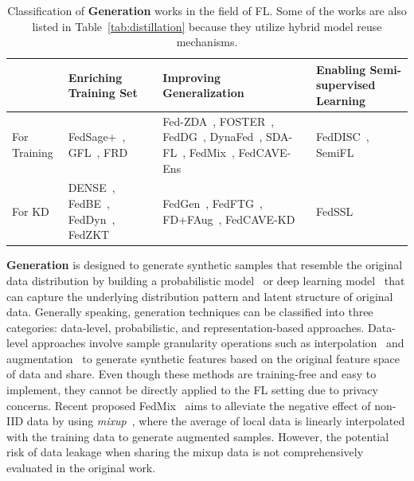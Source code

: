 \begin{table}[t]
  \centering
  \footnotesize
  \caption{Classification of \textbf{Generation} works in the field of FL. Some of the works are also listed in Table~\ref{tab:distillation} because they utilize hybrid model reuse mechanisms.}
  \label{tab:generation}

  \begin{tabular}{|l|p{3.1cm}|p{5cm}|p{4cm}|}
    \hline
    & Enriching Training Set & Improving Generalization  & Enabling Semi-supervised Learning  \\ \hline
    \multicolumn{1}{|l|}{For Training} & FedSage+~\cite{zhang2021subgraph}, GFL~\cite{cheng2023gfl}, \newline FRD~\cite{cha2019federated} & Fed-ZDA~\cite{hao2021towards}, FOSTER~\cite{yu2023turning}, FedDG~\cite{liu2021feddg}, DynaFed~\cite{pi2022dynafed}, SDA-FL~\cite{liz2022federated}, FedMix~\cite{yoon2021fedmix}, \newline FedCAVE-Ens~\cite{heinbaugh2023data} & FedDISC~\cite{yang2023exploring}, SemiFL~\cite{diao2022semifl}  \\ \hline
    \multicolumn{1}{|l|}{For KD} & DENSE~\cite{zhang2022dense}, FedBE~\cite{chen2020fedbe}, \newline FedDyn~\cite{jin2023feddyn}, FedZKT~\cite{zhang2022fedzkt} & FedGen~\cite{zhu2021data}, FedFTG~\cite{zhang2022fine}, FD+FAug~\cite{jeong2018communication}, \newline FedCAVE-KD~\cite{heinbaugh2023data} & FedSSL~\cite{fan2022private} \\ \hline
  \end{tabular}
\end{table}

\textbf{Generation} is designed to generate synthetic samples that resemble the original data distribution by building a probabilistic model~\cite{geyer1992practical} or deep learning model~\cite{kingma2014auto, goodfellow2020generative, cao2022survey} that can capture the underlying distribution pattern and latent structure of original data.
Generally speaking, generation techniques can be classified into three categories: data-level, probabilistic, and representation-based approaches.
Data-level approaches involve sample granularity operations such as interpolation~\cite{chawla2002smote, zhangmixup} and augmentation~\cite{wong2016understanding} to generate synthetic features based on the original feature space of data and share.
Even though these methods are training-free and easy to implement, they cannot be directly applied to the FL setting due to privacy concerns.
Recent proposed FedMix~\cite{yoon2021fedmix} aims to alleviate the negative effect of non-IID data by using \textit{mixup}~\cite{zhangmixup}, where the average of local data is linearly interpolated with the training data to generate augmented samples.
However, the potential risk of data leakage when sharing the mixup data is not comprehensively evaluated in the original work.


